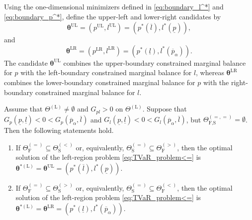\documentclass[a4paper,12pt]{article}
\begin{document}
Using the one-dimensional minimizers defined in \eqref{eq:boundary_l^*} and \eqref{eq:boundary_p^*}, define the upper-left and lower-right candidates by
\begin{equation}
{\bm\theta}^{\text{UL}}=\left(p^{\text{UL}},l^{\text{UL}}\right)=\left(p^*\left(\overline{l}\right),l^*\left(\underline{p}\right)\right),
\label{eq:theta_UL}
\end{equation}
and
\begin{equation}
{\bm\theta}^{\text{LR}}=\left(p^{\text{LR}},l^{\text{LR}}\right)=\left(p^*\left(\underline{l}\right),l^*\left(\overline{p}_{\alpha}\right)\right).
\label{eq:theta_LR}
\end{equation}
The candidate ${\bm\theta}^{\text{UL}}$ combines the upper-boundary constrained marginal balance for $p$ with the left-boundary constrained marginal balance for $l$, whereas ${\bm\theta}^{\text{LR}}$ combines the lower-boundary constrained marginal balance for $p$ with the right-boundary constrained marginal balance for $l$.

\begin{proposition}\label{prop:tvar_second_result}
Assume that $\Theta^{\left(\text{L}\right)}\neq\emptyset$ and $G_{pl}>0$ on $\Theta^{\left(\text{L}\right)}$. Suppose that $G_p\left(\underline{p},\underline{l}\right)<0<G_p\left(\overline{p}_{\alpha},\overline{l}\right)$ and $G_l\left(\underline{p},\underline{l}\right)<0<G_l\left(\overline{p}_{\alpha},\overline{l}\right)$, but $\Theta_{\text{F,S}}^{\left(=,=\right)}=\emptyset$. Then the following statements hold.

\begin{enumerate}
\item[(i)] If $\Theta_{\text{F}}^{\left(=\right)}\subseteq\Theta_{\text{S}}^{\left(<\right)}$ or, equivalently, $\Theta_{\text{S}}^{\left(=\right)}\subseteq\Theta_{\text{F}}^{\left(>\right)}$, then the optimal solution of the left-region problem \eqref{eq:TVaR_problem<=} is ${\bm\theta}^{*\left(\text{L}\right)}={\bm\theta}^{\text{UL}}=\left(p^*\left(\overline{l}\right),l^*\left(\underline{p}\right)\right)$.
\item[(ii)] If $\Theta_{\text{F}}^{\left(=\right)}\subseteq\Theta_{\text{S}}^{\left(>\right)}$ or, equivalently, $\Theta_{\text{S}}^{\left(=\right)}\subseteq\Theta_{\text{F}}^{\left(<\right)}$, then the optimal solution of the left-region problem \eqref{eq:TVaR_problem<=} is ${\bm\theta}^{*\left(\text{L}\right)}={\bm\theta}^{\text{LR}}=\left(p^*\left(\underline{l}\right),l^*\left(\overline{p}_{\alpha}\right)\right)$.
\end{enumerate}
\end{proposition}
\end{document}
